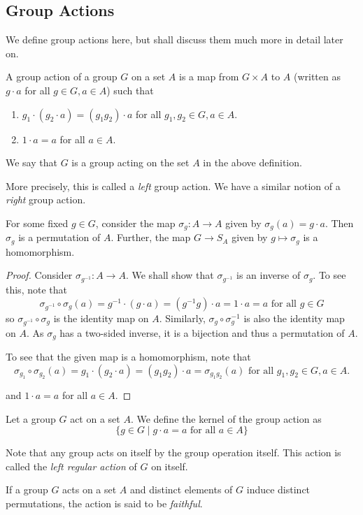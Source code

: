 \subsection{Group Actions}
We define group actions here, but shall discuss them much more in detail later on.
\begin{definition}
    A group action of a group $G$ on a set $A$ is a map from $G\times A$ to $A$ (written as $g\cdot a$ for all $g\in G, a\in A$) such that
    \begin{enumerate}
        \item $g_1\cdot(g_2\cdot a)=(g_1g_2)\cdot a$ for all $g_1,g_2\in G, a\in A$.
        \item $1\cdot a=a$ for all $a\in A$.
    \end{enumerate}
\end{definition}

We say that $G$ is a group acting on the set $A$ in the above definition.

More precisely, this is called a \textit{left} group action. We have a similar notion of a \textit{right} group action.

\begin{theorem}
    For some fixed $g\in G$, consider the map $\sigma_g:A\to A$ given by $\sigma_g(a)=g\cdot a$. Then $\sigma_g$ is a permutation of $A$. Further, the map $G\to S_A$ given by $g\mapsto \sigma_g$ is a homomorphism.
\end{theorem}
\begin{proof}
    Consider $\sigma_{g^{-1}}:A\to A$. We shall show that $\sigma_{g^{-1}}$ is an inverse of $\sigma_g$. To see this, note that
    $$\sigma_{g^{-1}}\circ\sigma_g(a)=g^{-1}\cdot(g\cdot a)=(g^{-1}g)\cdot a=1\cdot a=a\text{ for all $g\in G$}$$
    so $\sigma_{g^{-1}}\circ\sigma_g$ is the identity map on $A$. Similarly, $\sigma_g\circ\sigma_g^{-1}$ is also the identity map on $A$. As $\sigma_g$ has a two-sided inverse, it is a bijection and thus a permutation of $A$.
    
    To see that the given map is a homomorphism, note that $$\sigma_{g_1}\circ\sigma_{g_2}(a)=g_1\cdot(g_2\cdot a)=(g_1g_2)\cdot a=\sigma_{g_1g_2}(a)\text{ for all $g_1,g_2\in G, a\in A$}.$$
    
    and $1\cdot a=a$ for all $a\in A$.
\end{proof}

\begin{definition}
\label{defKerGrpAc}
    Let a group $G$ act on a set $A$. We define the kernel of the group action as
    $$\{g\in G\mid g\cdot a=a\text{ for all }a\in A\}$$
\end{definition}

Note that any group acts on itself by the group operation itself. This action is called the \textit{left regular action} of $G$ on itself.

If a group $G$ acts on a set $A$ and distinct elements of $G$ induce distinct permutations, the action is said to be \textit{faithful}.

\clearpage